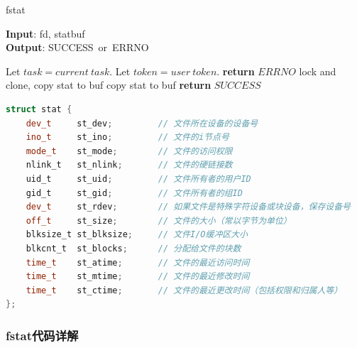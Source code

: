 \begin{algorithm}[tb]
    \caption{fstat}
    \label{alg:algorithm}
    \textbf{Input}: fd, statbuf\\
    \textbf{Output}: SUCCESS~or~ERRNO
    \begin{algorithmic}[1] %

        \State Let $task=current~task$.
        \State Let $token=user~token$.
        \State \textbf{return} $ERRNO$
        \Else {}
        \State lock and clone, copy stat to buf
        \Else
        \State copy stat to buf
        \EndIf
        \State \textbf{return} $SUCCESS$
        \EndIf
    \end{algorithmic}
\end{algorithm}



\begin{algorithm}[tb]
\centering
\begin{lstlisting}[language={Rust}, label={code:new_area},
	caption={stat示意结构体}]
    struct stat {
    dev_t     st_dev;         // 文件所在设备的设备号
    ino_t     st_ino;         // 文件的i节点号
    mode_t    st_mode;        // 文件的访问权限
    nlink_t   st_nlink;       // 文件的硬链接数
    uid_t     st_uid;         // 文件所有者的用户ID
    gid_t     st_gid;         // 文件所有者的组ID
    dev_t     st_rdev;        // 如果文件是特殊字符设备或块设备，保存设备号
    off_t     st_size;        // 文件的大小（常以字节为单位）
    blksize_t st_blksize;     // 文件I/O缓冲区大小
    blkcnt_t  st_blocks;      // 分配给文件的块数
    time_t    st_atime;       // 文件的最近访问时间
    time_t    st_mtime;       // 文件的最近修改时间
    time_t    st_ctime;       // 文件的最近更改时间（包括权限和归属人等）
};
\end{lstlisting}
\end{algorithm}

\subsubsection{fstat代码详解}

